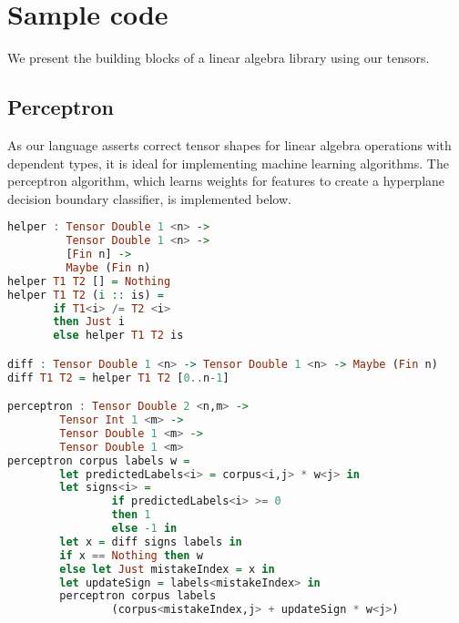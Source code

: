 \documentclass[12pt]{article}
\begin{document}
\section{Sample code}
We present the building blocks of a linear algebra library using our tensors.
\subsection{Perceptron}
As our language asserts correct tensor shapes for linear algebra operations with dependent types, it is ideal for implementing machine learning algorithms. The perceptron algorithm, which learns weights for features to create a hyperplane decision boundary classifier, is implemented below.
\begin{lstlisting}[language=Haskell]
helper : Tensor Double 1 <n> -> 
         Tensor Double 1 <n> -> 
         [Fin n] -> 
         Maybe (Fin n)
helper T1 T2 [] = Nothing
helper T1 T2 (i :: is) = 
       if T1<i> /= T2 <i>
       then Just i
       else helper T1 T2 is

diff : Tensor Double 1 <n> -> Tensor Double 1 <n> -> Maybe (Fin n)
diff T1 T2 = helper T1 T2 [0..n-1]

perceptron : Tensor Double 2 <n,m> -> 
        Tensor Int 1 <m> -> 
        Tensor Double 1 <m> ->
        Tensor Double 1 <m>
perceptron corpus labels w =
        let predictedLabels<i> = corpus<i,j> * w<j> in
        let signs<i> = 
                if predictedLabels<i> >= 0
                then 1
                else -1 in
        let x = diff signs labels in
        if x == Nothing then w
        else let Just mistakeIndex = x in
        let updateSign = labels<mistakeIndex> in 
        perceptron corpus labels 
                (corpus<mistakeIndex,j> + updateSign * w<j>)
\end{lstlisting}
\end{document}
